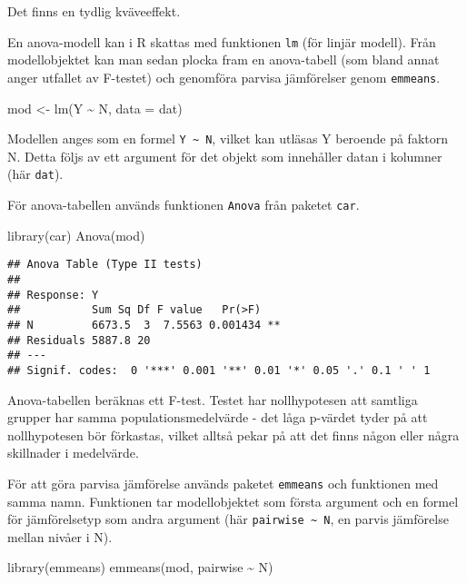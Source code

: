 \documentclass[
]{book}
\newenvironment{Shaded}{\begin{snugshade}}{\end{snugshade}}
\newcommand{\AttributeTok}[1]{\textcolor[rgb]{0.77,0.63,0.00}{#1}}
\newcommand{\FunctionTok}[1]{\textcolor[rgb]{0.00,0.00,0.00}{#1}}
\newcommand{\NormalTok}[1]{#1}
\newcommand{\OtherTok}[1]{\textcolor[rgb]{0.56,0.35,0.01}{#1}}
\newcommand{\SpecialCharTok}[1]{\textcolor[rgb]{0.00,0.00,0.00}{#1}}
\theoremstyle{definition}
\theoremstyle{definition}
\theoremstyle{definition}
\theoremstyle{definition}
\theoremstyle{remark}
\begin{document}
Det finns en tydlig kväveeffekt.

En anova-modell kan i R skattas med funktionen \texttt{lm} (för linjär modell). Från modellobjektet kan man sedan plocka fram en anova-tabell (som bland annat anger utfallet av F-testet) och genomföra parvisa jämförelser genom \texttt{emmeans}.

\begin{Shaded}
\begin{Highlighting}[]
\NormalTok{mod }\OtherTok{\textless{}{-}} \FunctionTok{lm}\NormalTok{(Y }\SpecialCharTok{\textasciitilde{}}\NormalTok{ N, }\AttributeTok{data =}\NormalTok{ dat)}
\end{Highlighting}
\end{Shaded}

Modellen anges som en formel \texttt{Y\ \textasciitilde{}\ N}, vilket kan utläsas Y beroende på faktorn N. Detta följs av ett argument för det objekt som innehåller datan i kolumner (här \texttt{dat}).

För anova-tabellen används funktionen \texttt{Anova} från paketet \texttt{car}.

\begin{Shaded}
\begin{Highlighting}[]
\FunctionTok{library}\NormalTok{(car)}
\FunctionTok{Anova}\NormalTok{(mod)}
\end{Highlighting}
\end{Shaded}

\begin{verbatim}
## Anova Table (Type II tests)
## 
## Response: Y
##           Sum Sq Df F value   Pr(>F)   
## N         6673.5  3  7.5563 0.001434 **
## Residuals 5887.8 20                    
## ---
## Signif. codes:  0 '***' 0.001 '**' 0.01 '*' 0.05 '.' 0.1 ' ' 1
\end{verbatim}

Anova-tabellen beräknas ett F-test. Testet har nollhypotesen att samtliga grupper har samma populationsmedelvärde - det låga p-värdet tyder på att nollhypotesen bör förkastas, vilket alltså pekar på att det finns någon eller några skillnader i medelvärde.

För att göra parvisa jämförelse används paketet \texttt{emmeans} och funktionen med samma namn. Funktionen tar modellobjektet som första argument och en formel för jämförelsetyp som andra argument (här \texttt{pairwise\ \textasciitilde{}\ N}, en parvis jämförelse mellan nivåer i N).

\begin{Shaded}
\begin{Highlighting}[]
\FunctionTok{library}\NormalTok{(emmeans)}
\FunctionTok{emmeans}\NormalTok{(mod, pairwise }\SpecialCharTok{\textasciitilde{}}\NormalTok{ N)}
\end{Highlighting}
\end{Shaded}
\end{document}
